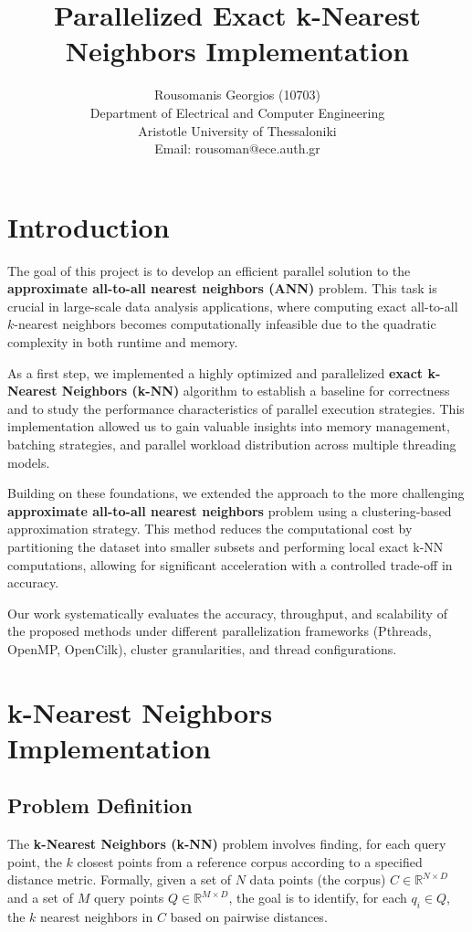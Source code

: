 \documentclass{article}
\title{Parallelized Exact k-Nearest Neighbors Implementation}
\author{Rousomanis Georgios (10703)\\
Department of Electrical and Computer Engineering\\
Aristotle University of Thessaloniki\\
Email: rousoman@ece.auth.gr
}
\begin{document}
\maketitle

\section{Introduction}

The goal of this project is to develop an efficient parallel solution to the 
\textbf{approximate all-to-all nearest neighbors (ANN)} problem. This task is crucial in 
large-scale data analysis applications, where computing exact all-to-all $k$-nearest neighbors 
becomes computationally infeasible due to the quadratic complexity in both runtime and memory. 

As a first step, we implemented a highly optimized and parallelized 
\textbf{exact k-Nearest Neighbors (k-NN)} algorithm to establish a baseline for correctness and 
to study the performance characteristics of parallel execution strategies. This implementation 
allowed us to gain valuable insights into memory management, batching strategies, and parallel 
workload distribution across multiple threading models.

Building on these foundations, we extended the approach to the more challenging 
\textbf{approximate all-to-all nearest neighbors} problem using a clustering-based approximation 
strategy. This method reduces the computational cost by partitioning the dataset into smaller 
subsets and performing local exact k-NN computations, allowing for significant acceleration
with a controlled trade-off in accuracy.

Our work systematically evaluates the accuracy, throughput, and scalability of the proposed 
methods under different parallelization frameworks (Pthreads, OpenMP, OpenCilk), cluster 
granularities, and thread configurations.

\section{k-Nearest Neighbors Implementation}

\subsection{Problem Definition}

The \textbf{k-Nearest Neighbors (k-NN)} problem involves finding, for each query point, the $k$ 
closest points from a reference corpus according to a specified distance metric. Formally, given 
a set of $N$ data points (the corpus) $C \in \mathbb{R}^{N \times D}$ and a set of $M$ query 
points $Q \in \mathbb{R}^{M \times D}$, the goal is to identify, for each $q_i \in Q$, the $k$ 
nearest neighbors in $C$ based on pairwise distances.
\end{document}
